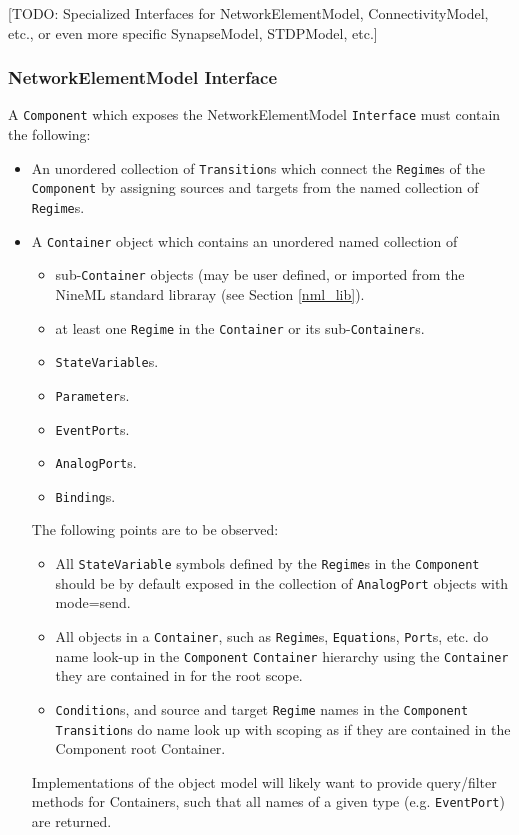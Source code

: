 \documentclass[a4paper]{article}
\newcommand\nmlClass[1]{{\tt #1}}
\begin{document}
[TODO: Specialized Interfaces for NetworkElementModel, ConnectivityModel, etc., or even more specific SynapseModel, STDPModel, etc.]



\subsubsection{NetworkElementModel Interface}
A \nmlClass{Component} which exposes the NetworkElementModel
\nmlClass{Interface} must contain the following:
\begin{itemize}
\item An unordered collection of \nmlClass{Transition}s which connect the \nmlClass{Regime}s
  of the \nmlClass{Component} by assigning sources and targets from the named
  collection of \nmlClass{Regime}s.

\item A \nmlClass{Container} object which contains an unordered named collection of
\begin{itemize}
\item sub-\nmlClass{Container} objects (may be user defined, or imported from the NineML standard libraray (see Section \ref{nml_lib}).
\item at least one \nmlClass{Regime} in the \nmlClass{Container} or its sub-\nmlClass{Container}s.
\item \nmlClass{StateVariable}s.
\item \nmlClass{Parameter}s.
\item \nmlClass{EventPort}s.
\item \nmlClass{AnalogPort}s.
\item \nmlClass{Binding}s.
\end{itemize}

The following points are to be observed:
\begin{itemize}
\item All \nmlClass{StateVariable} symbols defined by the
  \nmlClass{Regime}s in the \nmlClass{Component} should be by default
  exposed in the collection of \nmlClass{AnalogPort} objects with
  mode=send.
\item All objects in a \nmlClass{Container}, such as
  \nmlClass{Regime}s, \nmlClass{Equation}s, \nmlClass{Port}s, etc. do
  name look-up in the \nmlClass{Component} \nmlClass{Container}
  hierarchy using the \nmlClass{Container} they are contained in for
  the root scope.
\item \nmlClass{Condition}s, and source and target \nmlClass{Regime}
  names in the \nmlClass{Component} \nmlClass{Transition}s do name
  look up with scoping as if they are contained in the Component root
  Container.
\end{itemize}

Implementations of the object model will likely want to provide
query/filter methods for Containers, such that all names of a given
type (e.g. \nmlClass{EventPort}) are returned.

\end{itemize}
\end{document}
